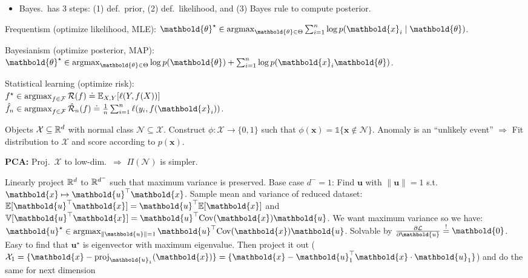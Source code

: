 \documentclass[9pt]{extarticle}
\newenvironment{topic}[1]
{\textbf{\sffamily \colorbox{black}{\rlap{\textbf{\textcolor{white}{#1}}}\hspace{\linewidth}\hspace{-2\fboxsep}}}}
{}
\newenvironment{subtopic}[1]
{\textbf{\sffamily #1:}}
{}
\renewcommand{\vec}[1]{\ensuremath{\mathbold{#1}}}
\renewcommand{\Var}{\mathbb{V}}
\begin{document}
\begin{multicols*}{3}
\begin{itemize}[left=0pt]
        \item Bayes.\ has 3 steps: (1) def.\ prior, (2) def.\ likelihood, and (3) Bayes rule to compute
              posterior.
    \end{itemize}

    \begin{topic}{Paradigms of data science}
        Frequentism (optimize likelihood, MLE): $\vec{\theta}^\star \in \argmax_{\vec{\theta} \in \Theta} \sum_{i=1}^{n} \log p(\vec{x}_i \mid \vec{\theta})$.

        Bayesianism (optimize posterior, MAP): $\vec{\theta}^\star \in \argmax_{\vec{\theta} \in \Theta}
            \log p(\vec{\theta}) + \sum_{i=1}^{n} \log p(\vec{x}_i \vec{\theta})$.

        Statistical learning (optimize risk): \\ $f^\star \in \operatorname*{argmax}_{f \in \mathcal{F}} \mathcal{R}(f)
            \doteq \mathbb{E}_{X,Y}[\ell(Y, f(X))]$ \\ $\hat{f}_n \in \argmax_{f \in \mathcal{F}}
            \hat{\mathcal{R}}_n(f) \doteq \frac{1}{n} \sum_{i=1}^{n} \ell(y_i, f(\vec{x}_i))$.
    \end{topic}

    \begin{topic}{Anomaly detection}
        Objects $\mathcal{X} \subseteq \mathbb{R}^d$ with normal class $\mathcal{N} \subseteq \mathcal{X}$.
        Construct $\phi: \mathcal{X} \to \{ 0,1 \}$ such that $\phi(\vec{x}) =
            \mathbb{1}\{\vec{x} \not\in \mathcal{N}\}$. Anomaly is an ``unlikely event'' $\Rightarrow$
        Fit distribution to $\mathcal{X}$ and score according to $p(\vec{x})$.

        \begin{subtopic}{PCA}
            Proj.\ $\mathcal{X}$ to low-dim.\ $\Rightarrow$ $\Pi(\mathcal{N})$ is simpler.

            Linearly project $\mathbb{R}^d$ to $\mathbb{R}^{d^-}$ such that maximum variance is preserved. Base case $d^- = 1$:
            Find $\vec{u}$ with $\| \vec{u} \| = 1$ s.t.\ $\vec{x} \mapsto \transpose{\vec{u}} \vec{x}$. Sample
            mean and variance of reduced dataset: $\E[\transpose{\vec{u}} \vec{x}] = \transpose{\vec{u}}
                \E[\vec{x}]$ and $\Var[\transpose{\vec{u}} \vec{x}] = \transpose{\vec{u}} \mathrm{Cov}(\vec{x})
                \vec{u}$. We want maximum variance so we have: $\vec{u}^\star \in \argmax_{\| \vec{u} \|=1}
                \transpose{\vec{u}} \mathrm{Cov}(\vec{x}) \vec{u}$. Solvable by $\pdv{\mathcal{L}}{\vec{u}}
                \overset{!}{=} \vec{0}$. Easy to find that $\vec{u}^\star$ is eigenvector with maximum eigenvalue.
            Then project it out ($\mathcal{X}_1 = \{ \vec{x} - \mathrm{proj}_{\vec{u}_1}(\vec{x}) \} = \{
                \vec{x} - \transpose{\vec{u}_1} \vec{x} \cdot \vec{u}_1 \}$) and do the same for next dimension


\end{subtopic}
\end{topic}
\end{multicols*}
\end{document}
